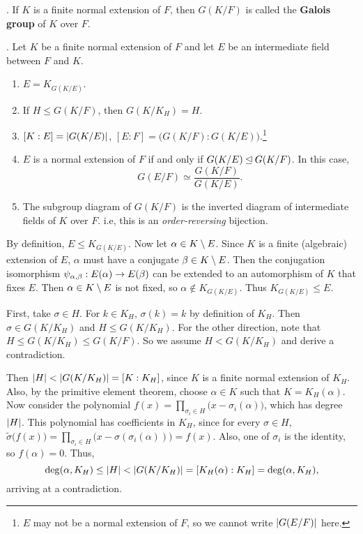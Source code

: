 .  If \(K\) is a finite normal extension of \(F\), then \(G(K/F)\) is called the \textbf{Galois group} of \(K\) over \(F\).

\thm.  Let \(K\) be a finite normal extension of \(F\) and let \(E\) be an intermediate field between \(F\) and \(K\).
\begin{enumerate}
    \item \(E = K_{G(K/E)}\).
    \item If \(H \leq G(K/F)\), then \(G(K/K_H) = H\).
    \item \([K : E] = \left| G(K/E) \right|\), \([E : F] = \bigl(G(K/F) : G(K/E)\bigr)\).\footnote{\(E\) may not be a normal extension of \(F\), so we cannot write \(\left| G(E/F) \right|\) here.}
    \item \(E\) is a normal extension of \(F\) if and only if \(G(K/E) \unlhd G(K/F)\). In this case,
          \[
              G(E/F) \simeq \frac{G(K/F)}{G(K/E)}.
          \]
    \item The subgroup diagram of \(G(K/F)\) is the inverted diagram of intermediate fields of \(K\) over \(F\). i.e, this is an \textit{order-reversing} bijection.
\end{enumerate}

\pf {} By definition, \(E \leq K_{G(K/E)}\). Now let \(\alpha \in K \setminus E\). Since \(K\) is a finite (algebraic) extension of \(E\), \(\alpha\) must have a conjugate \(\beta \in K \setminus E\). Then the conjugation isomorphism \(\psi_{\alpha, \beta} : E(\alpha) \rightarrow E(\beta)\) can be extended to an automorphism of \(K\) that fixes \(E\). Then \(\alpha \in K \setminus E\) is not fixed, so \(\alpha \notin K_{G(K/E)}\). Thus \(K_{G(K/E)} \leq E\).


 First, take \(\sigma \in H\). For \(k \in K_H\), \(\sigma(k) = k\) by definition of \(K_H\). Then \(\sigma \in G(K/K_H)\) and \(H \leq G(K/K_H)\). For the other direction, note that \(H \leq G(K/K_H) \leq G(K/F)\). So we assume \(H < G(K/K_H)\) and derive a contradiction.

Then \(\left| H \right| < \left| G(K/K_H) \right| = [K : K_H]\), since \(K\) is a finite normal extension of \(K_H\). Also, by the primitive element theorem, choose \(\alpha \in K\) such that \(K = K_H(\alpha)\). Now consider the polynomial \(f(x) = \prod_{\sigma_i \in H}\bigl(x - \sigma_i(\alpha)\bigr)\), which has degree \(\left| H \right|\). This polynomial has coefficients in \(K_H\), since for every \(\sigma \in H\), \(\tilde{\sigma}\bigl(f(x)\bigr) = \prod_{\sigma_i \in H}\bigl(x - \sigma(\sigma_i(\alpha))\bigr) = f(x)\). Also, one of \(\sigma_i\) is the identity, so \(f(\alpha) = 0\). Thus,
\[
    \deg(\alpha, K_H) \leq \left| H \right| < \left| G(K/K_H) \right| = [K_H(\alpha) : K_H] = \deg(\alpha, K_H),
\]
arriving at a contradiction.

